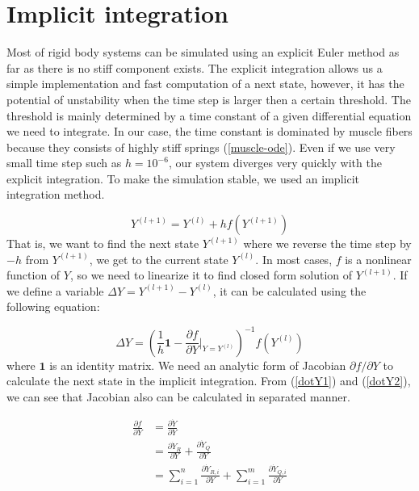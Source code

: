 \documentclass[a4paper,10pt]{article}
\begin{document}
\section{Implicit integration}

Most of rigid body systems can be simulated using an explicit Euler method
as far as there is no stiff component exists. The explicit integration
allows us a simple implementation and fast computation of a next state,
however, it has the potential of unstability when the time step is larger
then a certain threshold. The threshold is mainly determined by a time
constant of a given differential equation we need to integrate. In our case, the time
constant is dominated by muscle fibers because they consists
of highly stiff springs (\ref{muscle-ode}). Even if we use very small time step
such as $h=10^{-6}$, our system diverges very quickly with the explicit
integration. To make the simulation stable, we used an implicit integration
method.

\begin{equation}
Y^{(l+1)}=Y^{(l)}+hf(Y^{(l+1)})
\end{equation}
That is, we want to find the next state $Y^{(l+1)}$ where we
reverse the time step by $-h$ from $Y^{(l+1)}$, we get to the current state
$Y^{(l)}$. In most cases, $f$ is a nonlinear function of $Y$, so we need to
linearize it to find closed form solution of $Y^{(l+1)}$. If we define a
variable $\Delta Y = Y^{(l+1)}-Y^{(l)}$, it can be calculated using the
following equation:

\begin{equation}
\Delta Y = \left(  \frac{1}{h}\mathbf{1} - {\frac{\partial f}{\partial Y} \bigg|_{Y=Y^{(l)}}}\right)^{-1} f(Y^{(l)})
\end{equation}
where $\mathbf{1}$ is an identity matrix. We need an analytic form of
Jacobian $\partial f / \partial Y$ to calculate the next state in the
implicit integration. From (\ref{dotY1}) and (\ref{dotY2}), we can see that
Jacobian also can be calculated in separated manner.


\begin{align*}
\frac{\partial f}{\partial Y}
        & = \frac{\partial\dot{Y}}{\partial Y}\\
        & = \frac{\partial\dot{Y}_R}{\partial Y} + \frac{\partial\dot{Y}_Q}{\partial Y}\\
        & = \sum_{i=1}^{n}\frac{\partial\dot{Y}_{R,i}}{\partial Y} + \sum_{i=1}^{m}\frac{\partial\dot{Y}_{Q,i}}{\partial Y}
\end{align*}
\end{document}
